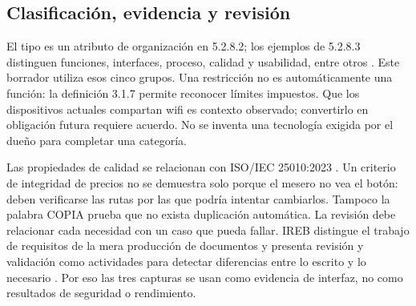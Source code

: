 \documentclass[11pt,a4paper]{article}
\begin{document}
\subsection{Clasificación, evidencia y revisión}
El tipo es un atributo de organización en 5.2.8.2; los ejemplos de 5.2.8.3 distinguen funciones, interfaces, proceso, calidad y usabilidad, entre otros \cite{iso29148}. Este borrador utiliza esos cinco grupos. Una restricción no es automáticamente una función: la definición 3.1.7 permite reconocer límites impuestos. Que los dispositivos actuales compartan wifi es contexto observado; convertirlo en obligación futura requiere acuerdo. No se inventa una tecnología exigida por el dueño para completar una categoría.

Las propiedades de calidad se relacionan con ISO/IEC 25010:2023 \cite{iso25010}. Un criterio de integridad de precios no se demuestra solo porque el mesero no vea el botón: deben verificarse las rutas por las que podría intentar cambiarlos. Tampoco la palabra COPIA prueba que no exista duplicación automática. La revisión debe relacionar cada necesidad con un caso que pueda fallar. IREB distingue el trabajo de requisitos de la mera producción de documentos y presenta revisión y validación como actividades para detectar diferencias entre lo escrito y lo necesario \cite{ireb2024}. Por eso las tres capturas se usan como evidencia de interfaz, no como resultados de seguridad o rendimiento.
\end{document}
